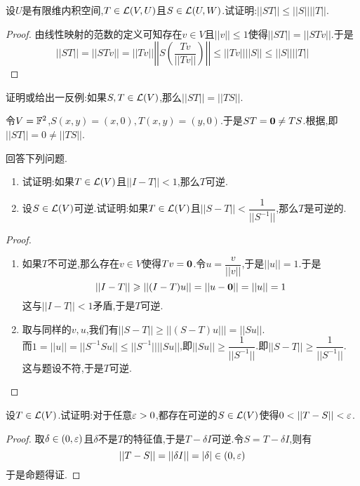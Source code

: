 \documentclass{ctexart}
\begin{document}
\begin{problem}[5.]
    设$U$是有限维内积空间,$T\in\mathcal{L}(V,U)$且$S\in\mathcal{L}(U,W)$.试证明:$||ST||\leqslant||S||||T||$.
\end{problem}
\begin{proof}
    由线性映射的范数的定义可知存在$v\in V$且$||v||\leqslant1$使得$||ST||=||STv||$.于是
    \[||ST||=||STv||=||Tv||\left|\left|S\left(\dfrac{Tv}{||Tv||}\right)\right|\right|\leqslant||Tv||||S||\leqslant||S||||T||\]
\end{proof}
\begin{problem}[6.]
    证明或给出一反例:如果$S,T\in\mathcal{L}(V)$,那么$||ST||=||TS||$.
\end{problem}
\begin{solution}
    令$V=\mathbb{F}^2$,$S(x,y)=(x,0),T(x,y)=(y,0)$.于是$ST=\mathbf0\neq TS$.根据,即$||ST||=0\neq||TS||$.
\end{solution}
\begin{problem}[8.]
    回答下列问题.
    \begin{enumerate}[label=\tbf{(\arabic*)}]
        \item 试证明:如果$T\in\mathcal{L}(V)$且$||I-T||<1$,那么$T$可逆.
        \item 设$S\in\mathcal{L}(V)$可逆.试证明:如果$T\in\mathcal{L}(V)$且$||S-T||<\dfrac{1}{||S^{-1}||}$,那么$T$是可逆的.
    \end{enumerate}
\end{problem}
\begin{proof}
    \begin{enumerate}[label=\tbf{(\arabic*)}]
        \item 如果$T$不可逆,那么存在$v\in V$使得$Tv=\mathbf0$.令$u=\dfrac{v}{||v||}$,于是$||u||=1$.于是
            \[||I-T||\geqslant||(I-T)u||=||u-\mathbf0||=||u||=1\]
            这与$||I-T||<1$矛盾,于是$T$可逆.
        \item 取与同样的$v,u$,我们有$||S-T||\geqslant||(S-T)u|||=||Su||$.\\
            而$1=||u||=||S^{-1}Su||\leqslant||S^{-1}||||Su||$,即$||Su||\geqslant\dfrac{1}{||S^{-1}||}$.即$||S-T||\geqslant\dfrac{1}{||S^{-1}||}$.\\
            这与题设不符,于是$T$可逆.
    \end{enumerate}
\end{proof}
\begin{problem}[9.]
    设$T\in\mathcal{L}(V)$.试证明:对于任意$\varepsilon>0$,都存在可逆的$S\in\mathcal{L}(V)$使得$0<||T-S||<\ep$.
\end{problem}
\begin{proof}
    取$\delta\in(0,\varepsilon)$且$\delta$不是$T$的特征值,于是$T-\delta I$可逆.令$S=T-\delta I$,则有
    \[||T-S||=||\delta I||=|\delta|\in(0,\varepsilon)\]
    于是命题得证.
\end{proof}
\end{document}
